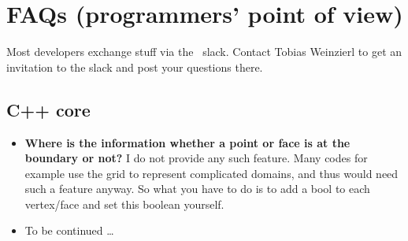 \chapter{FAQs (programmers' point of view)}


\begin{remark}
Most developers exchange stuff via the \Peano\ slack. 
Contact Tobias Weinzierl to get an invitation to the slack and post your
questions there.
\end{remark}


% 
% 
% 
% 
% 
% 
% 


\section{C++ core}

\begin{itemize}
  \item \textbf{Where is the information whether a point or face is at the
  boundary or not?}
  I do not provide any such feature. Many codes for example use the grid to
  represent complicated domains, and thus would need such a feature anyway. So
  what you have to do is to add a bool to each vertex/face and set this boolean
  yourself.
  \item To be continued \dots
\end{itemize}


